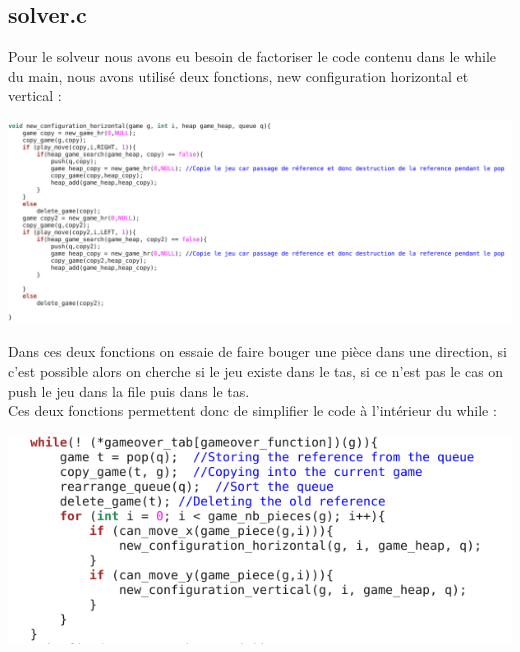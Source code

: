 \documentclass{article}
\begin{document}
\subsection {solver.c}
Pour le solveur nous avons eu besoin de factoriser le code contenu dans le while du main, nous avons utilisé deux fonctions, new configuration horizontal et vertical :
\begin{flushleft}
\includegraphics[scale=0.45]{new_configuration_horizontal.png}
\end{flushleft}
Dans ces deux fonctions on essaie de faire bouger une pièce dans une direction, si c'est possible alors on cherche si le jeu existe dans le tas, si ce n'est pas le cas on push le jeu dans la file puis dans le tas.
\\
Ces deux fonctions permettent donc de simplifier le code à l'intérieur du while :
\begin{flushleft}
\includegraphics[scale=0.45]{while_solver.png}
\end{flushleft}
\end{document}

